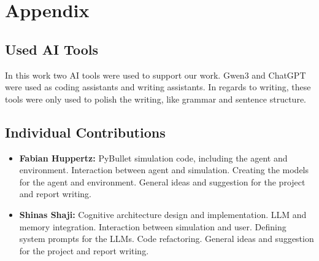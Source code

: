 \documentclass[../report.tex]{subfiles}
\begin{document}
\section*{Appendix}
\label{sec:appendix}

\subsection*{Used AI Tools}
In this work two AI tools were used to support our work. Gwen3 and ChatGPT were used as coding assistants and writing assistants. In regards to writing, these tools were only used to polish the writing, like grammar and sentence structure.

\subsection*{Individual Contributions}
\begin{itemize}
	\item \textbf{Fabian Huppertz:} PyBullet simulation code, including the agent and environment. Interaction between agent and simulation. Creating the models for the agent and environment. General ideas and suggestion for the project and report writing.
	\item \textbf{Shinas Shaji:} Cognitive architecture design and implementation. LLM and memory integration. Interaction between simulation and user. Defining system prompts for the LLMs. Code refactoring. General ideas and suggestion for the project and report writing.
\end{itemize}
\end{document}

